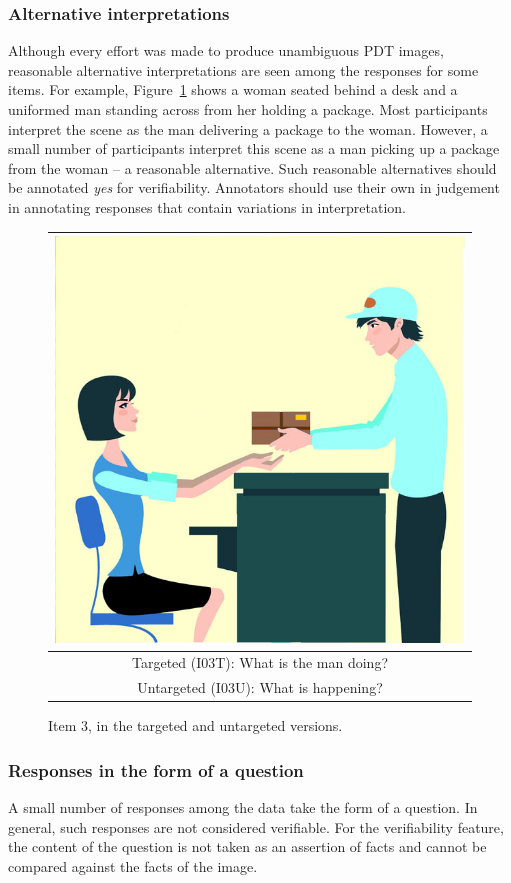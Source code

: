 \documentclass[12pt,notitlepage]{article}
\begin{document}
\subsubsection{Alternative interpretations} Although every effort was made to produce unambiguous PDT images, reasonable alternative interpretations are seen among the responses for some items. For example, Figure~\ref{fig:deliver-package} shows a woman seated behind a desk and a uniformed man standing across from her holding a package. Most participants interpret the scene as the man delivering a package to the woman. However, a small number of participants interpret this scene as a man picking up a package from the woman -- a reasonable alternative. Such reasonable alternatives should be annotated \textit{yes} for verifiability. Annotators should use their own in judgement in annotating responses that contain variations in interpretation.

\begin{figure}[h]
\begin{center}
\begin{tabular}{|c|}
\hline
\includegraphics[width=0.4\columnwidth,trim=0 0 0 -3]{../figures/I03.jpg}\\
\hline
Targeted (I03T): What is the man doing?\\
\hline
Untargeted (I03U): What is happening? \\
\hline
\end{tabular}
\end{center}
\caption{Item 3, in the targeted and untargeted versions.}
\label{fig:deliver-package}
\end{figure}

\subsubsection{Responses in the form of a question} \label{subsubsec:verif-question} A small number of responses among the data take the form of a question. In general, such responses are not considered verifiable. For the verifiability feature, the content of the question is not taken as an assertion of facts and cannot be compared against the facts of the image. 
\end{document}

